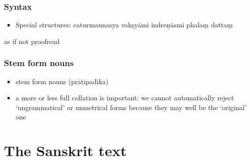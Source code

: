 \documentclass[11pt]{book}
\begin{document}
\subsubsection{Syntax}

\begin{itemize}

\item
  Special structures: caturmaunasya vakṣyāmi indreṇāsmi phalaṃ dattaṃ
\end{itemize}

as if not proofread

\subsubsection{Stem form nouns}

\begin{itemize}
\item
  stem form nouns (prātipadika)
\item
  a more or less full collation is important: we cannot automatically
  reject `ungrammatical' or unmetrical forms because they may well be
  the `original' one
\end{itemize}




\vfill
\pagebreak
















\vfill
\pagebreak




\section{The Sanskrit text}





\end{document}
